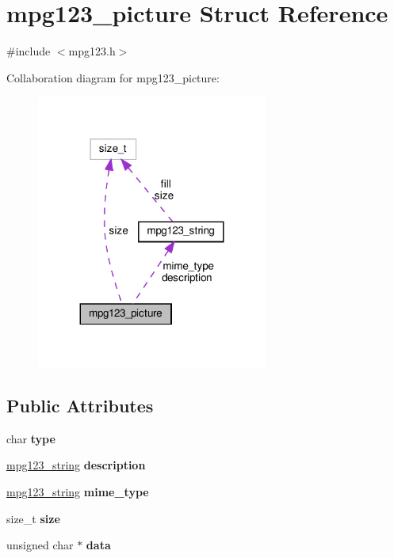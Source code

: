 \hypertarget{structmpg123__picture}{}\section{mpg123\+\_\+picture Struct Reference}
\label{structmpg123__picture}


{\ttfamily \#include $<$mpg123.\+h$>$}



Collaboration diagram for mpg123\+\_\+picture\+:
\nopagebreak
\begin{figure}[H]
\begin{center}
\leavevmode
\includegraphics[width=215pt]{structmpg123__picture__coll__graph}
\end{center}
\end{figure}
\subsection*{Public Attributes}
\begin{DoxyCompactItemize}
\item 
\mbox{\label{structmpg123__picture_a4b5897550d36cad90aa463e318a7ca54}} 
char {\bfseries type}
\item 
\mbox{\label{structmpg123__picture_a2bd7ec13cbd4cbe673cdccf5a0603a94}} 
\hyperlink{structmpg123__string}{mpg123\+\_\+string} {\bfseries description}
\item 
\mbox{\label{structmpg123__picture_ac36b86a29200e2df5ee60e9d73c231a6}} 
\hyperlink{structmpg123__string}{mpg123\+\_\+string} {\bfseries mime\+\_\+type}
\item 
\mbox{\label{structmpg123__picture_adac68a10895739d1d1772f6340c384eb}} 
size\+\_\+t {\bfseries size}
\item 
\mbox{\label{structmpg123__picture_a54ecf70709e07dc972978d5381bb2e7a}} 
unsigned char $\ast$ {\bfseries data}
\end{DoxyCompactItemize}


